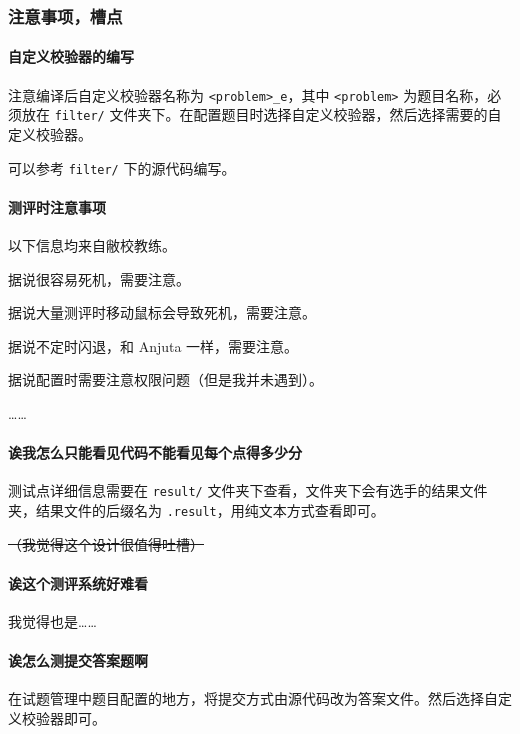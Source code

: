 \subsubsection{注意事项，槽点}

\paragraph{自定义校验器的编写}

注意编译后自定义校验器名称为 \texttt{<problem>\_e}，其中 \texttt{<problem>} 为题目名称，必须放在 \texttt{filter/} 文件夹下。在配置题目时选择自定义校验器，然后选择需要的自定义校验器。

可以参考 \texttt{filter/} 下的源代码编写。

\paragraph{测评时注意事项}

以下信息均来自敝校教练。

据说很容易死机，需要注意。

据说大量测评时移动鼠标会导致死机，需要注意。

据说不定时闪退，和 Anjuta 一样，需要注意。

据说配置时需要注意权限问题（但是我并未遇到）。

……

\paragraph{诶我怎么只能看见代码不能看见每个点得多少分}

测试点详细信息需要在 \texttt{result/} 文件夹下查看，文件夹下会有选手的结果文件夹，结果文件的后缀名为 \texttt{.result}，用纯文本方式查看即可。

\sout{（我觉得这个设计很值得吐槽）}

\paragraph{诶这个测评系统好难看}

我觉得也是……

\paragraph{诶怎么测提交答案题啊}

在试题管理中题目配置的地方，将提交方式由源代码改为答案文件。然后选择自定义校验器即可。

